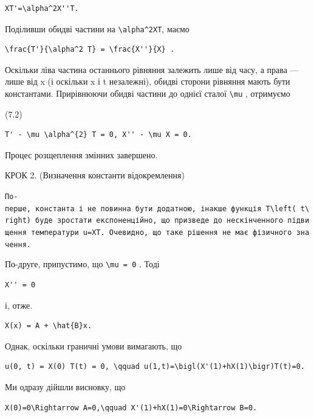 \documentclass[
  ukrainian,
]{article}
\begin{document}
\begin{verbatim}
XT'=\alpha^2X''T.
\end{verbatim}

Поділивши обидві частини на \texttt{\textbackslash{}alpha\^{}2XT}, маємо

\begin{verbatim}
\frac{T'}{\alpha^2 T} = \frac{X''}{X} .
\end{verbatim}

Оскільки ліва частина останнього рівняння залежить лише від часу, а
права --- лише від x (і оскільки x і t незалежні), обидві сторони
рівняння мають бути константами. Прирівнюючи обидві частини до однієї
сталої \texttt{\textbackslash{}mu} , отримуємо

(7.2)

\begin{verbatim}
T' - \mu \alpha^{2} T = 0, X'' - \mu X = 0.
\end{verbatim}

Процес розщеплення змінних завершено.

КРОК 2. (Визначення константи відокремлення)

\texttt{По-перше,\ константа\ і\ не\ повинна\ бути\ додатною,\ інакше\ функція\ \textquotesingle{}T\textbackslash{}left(\ t\textbackslash{}right)\textquotesingle{}\ буде\ зростати\ експоненційно,\ що\ призведе\ до\ нескінченного\ підвищення\ температури\ u=XT.\ Очевидно,\ що\ таке\ рішення\ не\ має\ фізичного\ значення.}

По-друге, припустимо, що \texttt{\textbackslash{}mu\ =\ 0} . Тоді

\begin{verbatim}
X'' = 0
\end{verbatim}

і, отже.

\begin{verbatim}
X(x) = A + \hat{B}x.
\end{verbatim}

Однак, оскільки граничні умови вимагають, що

\begin{verbatim}
u(0, t) = X(0) T(t) = 0, \qquad u(1,t)=\bigl(X'(1)+hX(1)\bigr)T(t)=0.
\end{verbatim}

Ми одразу дійшли висновку, що

\begin{verbatim}
X(0)=0\Rightarrow A=0,\qquad X'(1)+hX(1)=0\Rightarrow B=0.
\end{verbatim}
\end{document}
